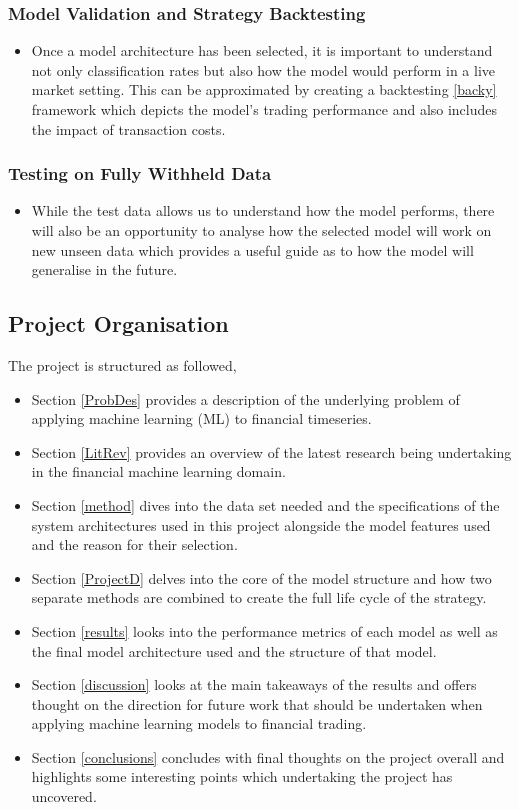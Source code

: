 \documentclass[11pt]{article}
\begin{document}
 \subsubsection{Model Validation and Strategy Backtesting}
	\begin{itemize}
	\item Once a model architecture has been selected, it is important to understand not only classification rates but also how the model would perform in a live market setting. This can be approximated by creating a backtesting \ref{backy} framework which depicts the model's trading performance and also includes the impact of transaction costs.
	\end{itemize}
\subsubsection{Testing on Fully Withheld Data}
	\begin{itemize}
	\item While the test data allows us to understand how the model performs, there will also be an opportunity to analyse how the selected model will work on new unseen data which provides a useful guide as to how the model will generalise in the future.
	\end{itemize}

\subsection{Project Organisation}
The project is structured as followed, 
\begin{itemize}
\item Section \ref{ProbDes} provides a description of the underlying problem of applying machine learning (ML) to financial timeseries.
\item Section \ref{LitRev} provides an overview of the latest research being undertaking in the financial machine learning domain.
\item Section \ref{method} dives into the data set needed and the specifications of the system architectures used in this project alongside the model features used and the reason for their selection.
\item Section \ref{ProjectD} delves into the core of the model structure and how two separate methods are combined to create the full life cycle of the strategy.
\item Section \ref{results} looks into the performance metrics of each model as well as the final model architecture used and the structure of that model.
\item Section  \ref{discussion} looks at the main takeaways of the results and offers thought on the direction for future work that should be undertaken when applying machine learning models to financial trading. 
\item Section \ref{conclusions} concludes with final thoughts on the project overall and highlights some interesting points which undertaking the project has uncovered. 
\end{itemize}
\end{document}
